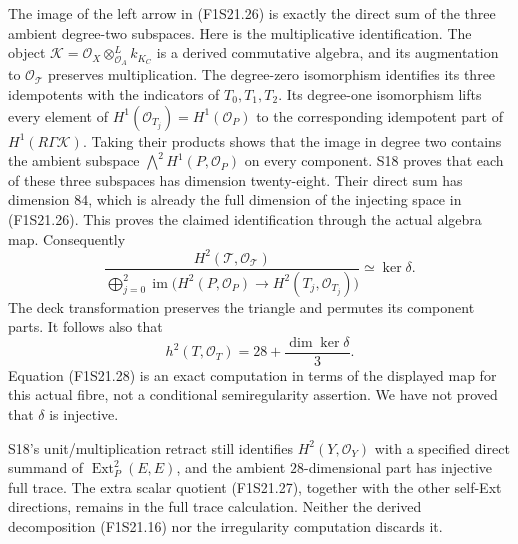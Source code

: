 The image of the left arrow in (F1S21.26) is exactly the
direct sum of the three ambient degree-two subspaces.
Here is the multiplicative identification. The object
$\mathcal K=\mathcal O_X\otimes^L_{\mathcal O_A}k_{K_C}$
is a derived commutative algebra, and its augmentation
to $\mathcal O_{\mathcal T}$ preserves multiplication.
The degree-zero isomorphism identifies its three
idempotents with the indicators of $T_0,T_1,T_2$.
Its degree-one isomorphism lifts every element of
$H^1(\mathcal O_{T_j})=H^1(\mathcal O_P)$ to the
corresponding idempotent part of $H^1(R\Gamma\mathcal K)$.
Taking their products shows that the image in degree
two contains the ambient subspace
$\bigwedge^2H^1(P,\mathcal O_P)$ on every component.
S18 proves that each of these three subspaces has
dimension twenty-eight. Their direct sum has dimension
$84$, which is already the full dimension of the
injecting space in (F1S21.26). This proves the claimed
identification through the actual algebra map.
Consequently
\[
 \frac{H^2(\mathcal T,\mathcal O_{\mathcal T})}
 {\displaystyle\bigoplus_{j=0}^2
       \operatorname{im}\bigl(H^2(P,\mathcal O_P)
                    \to H^2(T_j,\mathcal O_{T_j})\bigr)}
                          \simeq\ker\delta.
 \tag{F1S21.27}
\]
The deck transformation preserves the triangle and
permutes its component parts. It follows also that
\[
                 h^2(T,\mathcal O_T)
                       =28+\frac{\dim\ker\delta}{3}.
 \tag{F1S21.28}
\]
Equation (F1S21.28) is an exact computation in terms of
the displayed map for this actual fibre, not a
conditional semiregularity assertion. We have not
proved that $\delta$ is injective.

S18's unit/multiplication retract still identifies
$H^2(Y,\mathcal O_Y)$ with a specified direct summand
of $\operatorname{Ext}^2_P(E,E)$, and the ambient
$28$-dimensional part has injective full trace. The
extra scalar quotient (F1S21.27), together with the
other self-Ext directions, remains in the full
trace calculation. Neither the derived decomposition
(F1S21.16) nor the irregularity computation discards it.
